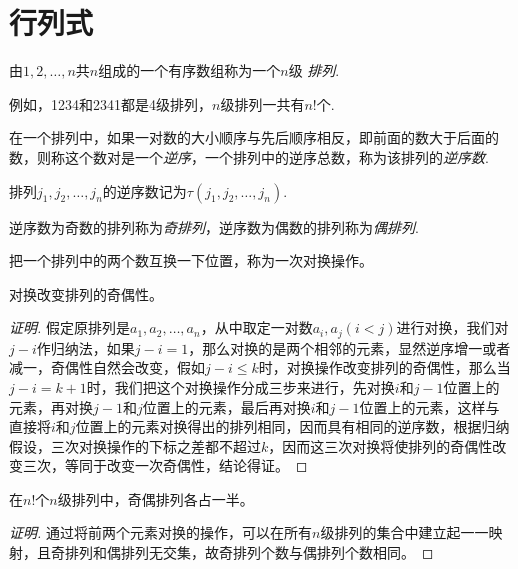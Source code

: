 
\section{行列式}
\label{sec:determinant}

\begin{definition}
  由$1,2,\ldots,n$共$n$组成的一个有序数组称为一个$n$级 \emph{排列}.
\end{definition}

例如，1234和2341都是4级排列，$n$级排列一共有$n!$个.

\begin{definition}
  在一个排列中，如果一对数的大小顺序与先后顺序相反，即前面的数大于后面的数，则称这个数对是一个\emph{逆序}，一个排列中的逆序总数，称为该排列的\emph{逆序数}.
\end{definition}

排列$j_1,j_2,\ldots,j_n$的逆序数记为$\tau(j_1,j_2,\ldots,j_n)$.

\begin{definition}
  逆序数为奇数的排列称为\emph{奇排列}，逆序数为偶数的排列称为\emph{偶排列}.
\end{definition}

把一个排列中的两个数互换一下位置，称为一次对换操作。

\begin{theorem}
  对换改变排列的奇偶性。
\end{theorem}

\begin{proof}[证明]
  假定原排列是$a_1,a_2,\ldots,a_n$，从中取定一对数$a_i,a_j(i<j)$进行对换，我们对$j-i$作归纳法，如果$j-i=1$，那么对换的是两个相邻的元素，显然逆序增一或者减一，奇偶性自然会改变，假如$j-i\leqslant k$时，对换操作改变排列的奇偶性，那么当$j-i=k+1$时，我们把这个对换操作分成三步来进行，先对换$i$和$j-1$位置上的元素，再对换$j-1$和$j$位置上的元素，最后再对换$i$和$j-1$位置上的元素，这样与直接将$i$和$j$位置上的元素对换得出的排列相同，因而具有相同的逆序数，根据归纳假设，三次对换操作的下标之差都不超过$k$，因而这三次对换将使排列的奇偶性改变三次，等同于改变一次奇偶性，结论得证。
\end{proof}

\begin{inference}
  在$n!$个$n$级排列中，奇偶排列各占一半。
\end{inference}

\begin{proof}[证明]
  通过将前两个元素对换的操作，可以在所有$n$级排列的集合中建立起一一映射，且奇排列和偶排列无交集，故奇排列个数与偶排列个数相同。
\end{proof}

